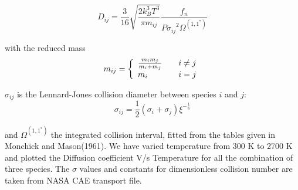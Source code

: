 $$D_{ij} = \frac{3}{16}\sqrt{\frac{2 k_B^3 T^3}{\pi m_{ij}}}\frac{f_n}{{ P \sigma_{ij}}^2   \Omega^{(1,1^*)}}$$

with  the reduced mass
\begin{equation}
m_{ij} = \left\{\begin{array}{l@{\qquad}l}
                \frac{m_i m_j}{m_i + m_j} &  i \neq j \\
                m_i                                  & i=j
                    \end{array}
              \right.
\end{equation}

$\sigma_{ij}$ is the Lennard-Jones collision diameter between species $i$ and $j$:
\begin{equation}
\sigma_{ij} = \frac{1}{2}\left(\sigma_i + \sigma_j\right) \xi^{-\frac{1}{6}}
\end{equation}

\noindent and $\Omega^{(1,1^*)}$ the integrated collision interval, fitted from the tables given in Monchick and Mason(1961). We have varied temperature from 300 K to 2700 K and plotted the Diffusion coefficient V/s Temperature for all the combination of three species. The $\sigma$ values and constants for dimensionless collision number are taken from NASA CAE transport file. 

